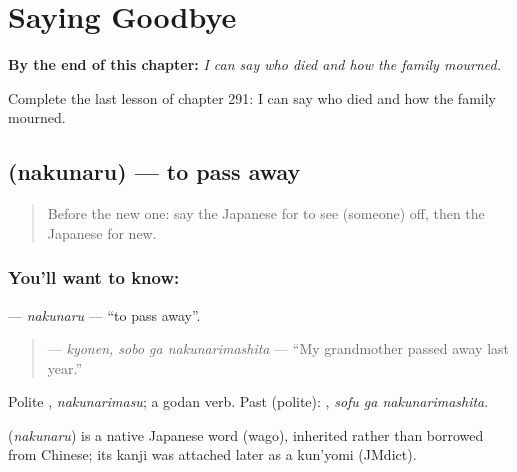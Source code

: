 
\chapter{Saying Goodbye}
\label{ch:ja-saying-goodbye}

\begin{chapteropening}
\textbf{By the end of this chapter:} \emph{I can say who died and how the family mourned.}

Complete the last lesson of chapter 291: I can say who died and how the family mourned.
\end{chapteropening}

\section[\texorpdfstring{\ja{なくなる} (nakunaru)}{なくなる (nakunaru)}]{ (nakunaru) — to pass away}

\label{lesson:JA-C291-nakunaru}



\begin{quote}
Before the new one: say the Japanese for to see (someone) off, then the Japanese for new.
\end{quote}

\subsection*{You'll want to know: }
\textbf{} — \emph{nakunaru} — \textquotedblleft{}to pass away\textquotedblright{}.

\begin{quote}
\textbf{ } — \emph{kyonen, sobo ga nakunarimashita} — \textquotedblleft{}My grandmother passed away last year.\textquotedblright{}
\end{quote}

Polite \textbf{}, \emph{nakunarimasu}; a godan verb. Past (polite): \textbf{ }, \emph{sofu ga nakunarimashita}.

\begin{cousinweb}
\textbf{} (\emph{nakunaru}) is a native Japanese word (wago), inherited rather than borrowed from Chinese; its kanji was attached later as a kun'yomi (JMdict).
\end{cousinweb}

